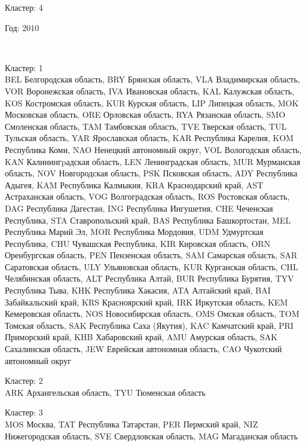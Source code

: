 \documentclass[11pt]{article}
\begin{document}
Кластер:  4 \\

\begin{center}
Год:  2010
\end{center}

    \begin{center}
    \end{center}
    { \hspace*{\fill} \\}
    

Кластер:  1 \\
BEL Белгородская область, BRY Брянская область, VLA Владимирская область, VOR Воронежская область, IVA Ивановская область, KAL Калужская область, KOS Костромская область, KUR Курская область, LIP Липецкая область, MOK Московская область, ORE Орловская область, RYA Рязанская область, SMO Смоленская область, TAM Тамбовская область, TVE Тверская область, TUL Тульская область, YAR Ярославская область, KAR Республика Карелия, KOM Республика Коми, NAO Ненецкий автономный округ, VOL Вологодская область, KAN Калинингpадская область, LEN Ленинградская область, MUR Мурманская область, NOV Новгородская область, PSK Псковская область, ADY Республика Адыгея, KAM Республика Калмыкия, KRA Краснодарский край, AST Астраханская область, VOG Волгоградская область, ROS Ростовская область, DAG Республика Дагестан, ING Республика Ингушетия, CHE Чеченская Республика, STA Ставропольский край, BAS Республика Башкортостан, MEL Республика Марий Эл, MOR Республика Мордовия, UDM Удмуртская Республика, CHU Чувашская Республика, KIR Кировская область, ORN Оренбургская область, PEN Пензенская область, SAM Самарская область, SAR Саратовская область, ULY Ульяновская область, KUR Курганская область, CHL Челябинская область, ALT Республика Алтай, BUR Республика Бурятия, TYV Республика Тыва, KHK Республика Хакасия, ATA Алтайский край, BAI Забайкальский край, KRS Красноярский край, IRK Иркутская область, KEM Кемеровская область, NOS Новосибирская область, OMS Омская область, TOM Томская область, SAK Республика Саха (Якутия), KAC Камчатский край, PRI Приморский край, KHB Хабаровский край, AMU Амурская область, SAK Сахалинская область, JEW Еврейская автономная область, CAO Чукотский автономный округ

Кластер:  2 \\
ARK Архангельская область, TYU Тюменская область

Кластер:  3 \\
MOS Москва, TAT Республика Татарстан, PER Пермский край, NIZ Нижегородская область, SVE Свердловская область, MAG Магаданская область
\end{document}
